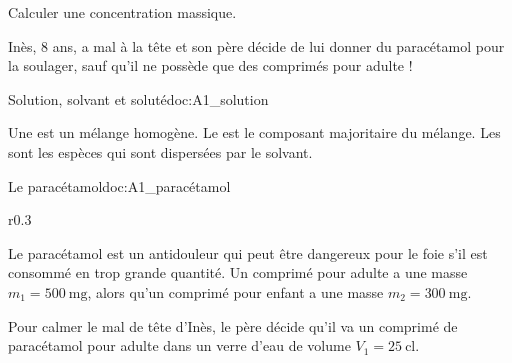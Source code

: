 \teteSndSolu

\vspace*{-36pt}

\begin{objectifs}
  \item Calculer une concentration massique.
\end{objectifs}


\begin{contexte}
  Inès, 8 ans, a mal à la tête et son père décide de lui donner du paracétamol pour la soulager, sauf qu'il ne possède que des comprimés pour adulte !

\end{contexte}


\begin{doc}{Solution, solvant et soluté}{doc:A1_solution}
  \begin{importants}
    Une  est un mélange homogène.
    Le  est le composant majoritaire du mélange.
    Les  sont les espèces qui sont dispersées par le solvant.
    \begin{center}
    \end{center}
  \end{importants}
\end{doc}

\begin{doc}{Le paracétamol}{doc:A1_paracétamol}
  \begin{wrapfigure}[5]{r}{0.3\linewidth}
    \vspace*{-30pt}
    \centering
  \end{wrapfigure}
  
  Le paracétamol est un antidouleur qui peut être dangereux pour le foie s'il est consommé en trop grande quantité.
  Un comprimé pour adulte a une masse $m_1 = \qty{500}{\milli\g}$, alors qu'un comprimé pour enfant a une masse $m_2 = \qty{300}{\milli\g}$.
  
  Pour calmer le mal de tête d'Inès, le père décide qu'il va  un comprimé de paracétamol pour adulte dans un verre d'eau de volume $V_1 = \qty{25}{\centi\litre}$.
\end{doc}


